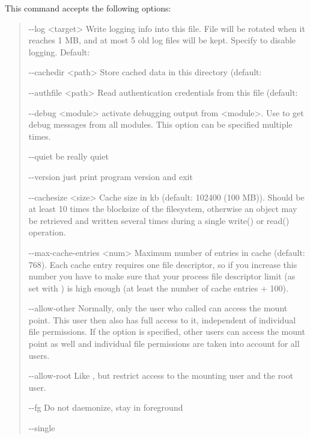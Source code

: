 \documentclass[letterpaper,10pt,english]{sphinxmanual}
\begin{document}
This command accepts the following options:
\begin{quote}
\begin{optionlist}{3cm}
\item [-{-}log \textless{}target\textgreater{}]  
Write logging info into this file. File will be
rotated when it reaches 1 MB, and at most 5 old log
files will be kept. Specify  to disable
logging. Default: 
\item [-{-}cachedir \textless{}path\textgreater{}]  
Store cached data in this directory (default:
\item [-{-}authfile \textless{}path\textgreater{}]  
Read authentication credentials from this file
(default: 
\item [-{-}debug \textless{}module\textgreater{}]  
activate debugging output from \textless{}module\textgreater{}. Use  to
get debug messages from all modules. This option can
be specified multiple times.
\item [-{-}quiet]  
be really quiet
\item [-{-}version]  
just print program version and exit
\item [-{-}cachesize \textless{}size\textgreater{}]  
Cache size in kb (default: 102400 (100 MB)). Should be
at least 10 times the blocksize of the filesystem,
otherwise an object may be retrieved and written
several times during a single write() or read()
operation.
\item [-{-}max-cache-entries \textless{}num\textgreater{}]  
Maximum number of entries in cache (default: 768).
Each cache entry requires one file descriptor, so if
you increase this number you have to make sure that
your process file descriptor limit (as set with
) is high enough (at least the number of
cache entries + 100).
\item [-{-}allow-other]  
Normally, only the user who called  can
access the mount point. This user then also has full
access to it, independent of individual file
permissions. If the  option is
specified, other users can access the mount point as
well and individual file permissions are taken into
account for all users.
\item [-{-}allow-root]  
Like , but restrict access to the
mounting user and the root user.
\item [-{-}fg]  
Do not daemonize, stay in foreground
\item [-{-}single]  

\end{optionlist}
\end{quote}
\end{document}
